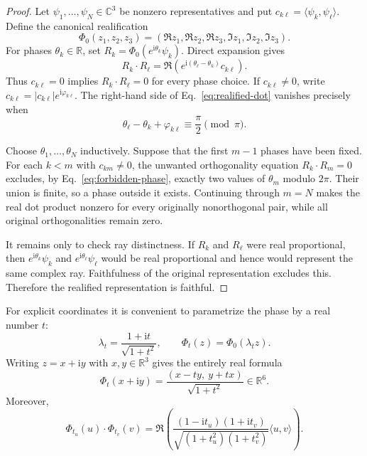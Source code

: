\documentclass[12pt,a4paper]{article}
\theoremstyle{definition}
\theoremstyle{remark}
\newcommand{\ii}{\mathrm{i}}
\newcommand{\C}{\mathbb C}
\newcommand{\R}{\mathbb R}
\begin{document}
\begin{proof}
Let $\psi_1,\ldots,\psi_N\in\C^3$ be nonzero representatives and put
$c_{k\ell}=\langle\psi_k,\psi_\ell\rangle$.  Define the canonical
realification
\begin{equation}
 \Phi_0(z_1,z_2,z_3)
 = (\Re z_1,\Re z_2,\Re z_3,\Im z_1,\Im z_2,\Im z_3).
 \label{eq:canonical-realification}
\end{equation}
For phases $\theta_k\in\R$, set
$R_k=\Phi_0(e^{\ii\theta_k}\psi_k)$.  Direct expansion gives
\begin{equation}
 R_k\mathbin{\cdot}R_\ell
 =\Re\!\left(e^{\ii(\theta_\ell-\theta_k)}c_{k\ell}\right).
 \label{eq:realified-dot}
\end{equation}
Thus $c_{k\ell}=0$ implies $R_k\cdot R_\ell=0$ for every phase choice.
If $c_{k\ell}\ne0$, write
$c_{k\ell}=|c_{k\ell}|e^{\ii\varphi_{k\ell}}$.  The right-hand side of
Eq.~\eqref{eq:realified-dot} vanishes precisely when
\begin{equation}
 \theta_\ell-\theta_k+\varphi_{k\ell}
 \equiv\frac{\pi}{2}\pmod\pi.
 \label{eq:forbidden-phase}
\end{equation}

Choose $\theta_1,\ldots,\theta_N$ inductively.  Suppose that the first $m-1$
phases have been fixed.  For each $k<m$ with $c_{km}\ne0$, the unwanted
orthogonality equation $R_k\mathbin{\cdot}R_m=0$ excludes, by
Eq.~\eqref{eq:forbidden-phase}, exactly two values of $\theta_m$ modulo
$2\pi$.  Their union is finite, so a phase outside it exists.  Continuing
through $m=N$ makes the real dot product nonzero for every originally
nonorthogonal pair, while all original orthogonalities remain zero.

It remains only to check ray distinctness.  If $R_k$ and $R_\ell$ were real
proportional, then $e^{\ii\theta_k}\psi_k$ and
$e^{\ii\theta_\ell}\psi_\ell$ would be real proportional and hence would
represent the same complex ray.  Faithfulness of the original representation
excludes this.  Therefore the realified representation is faithful.
\end{proof}

For explicit coordinates it is convenient to parametrize the phase by a real
number $t$:
\begin{equation}
 \lambda_t=\frac{1+\ii t}{\sqrt{1+t^2}},\qquad
 \Phi_t(z)=\Phi_0(\lambda_tz).
 \label{eq:lambda-t}
\end{equation}
Writing $z=x+\ii y$ with $x,y\in\R^3$ gives the entirely real formula
\begin{equation}
 \Phi_t(x+\ii y)=\frac{(x-ty,\ y+tx)}{\sqrt{1+t^2}}\in\R^6.
 \label{eq:explicit-realification}
\end{equation}
Moreover,
\begin{equation}
 \Phi_{t_u}(u)\mathbin{\cdot}\Phi_{t_v}(v)
 =\Re\!\left(
 \frac{(1-\ii t_u)(1+\ii t_v)}
 {\sqrt{(1+t_u^2)(1+t_v^2)}}\langle u,v\rangle
 \right).
 \label{eq:t-dot}
\end{equation}
\end{document}
